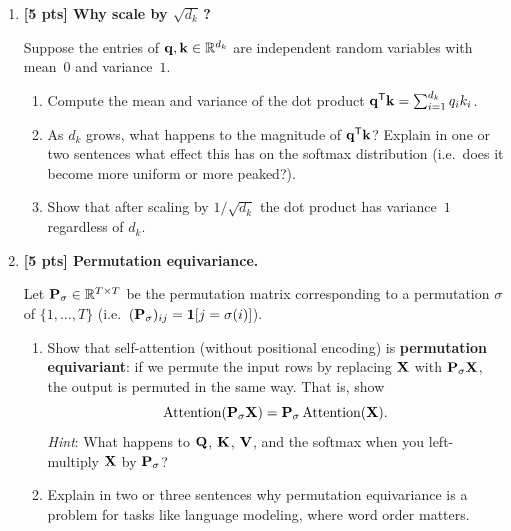 \documentclass[submit]{../harvardml}
\begin{document}
\begin{problem}
\begin{enumerate}
\begin{enumerate}
  \item Compute the scaled score matrix $\boldS / \sqrt{d_k}$.
  Then apply softmax row-wise to obtain the attention weight matrix
  $\boldA \in \reals^{2 \times 2}$.

  You may leave your answer in terms of $e^{(\cdot)}$ and sums, or compute
  decimal approximations.
\end{enumerate}
\item \textbf{[5 pts] Why scale by $\sqrt{d_k}$\,?}

Suppose the entries of $\mathbf{q}, \mathbf{k} \in \mathbb{R}^{d_k}$ are independent random
variables with mean~$0$ and variance~$1$.

\begin{enumerate}
  \item Compute the mean and variance of the dot product
  $\mathbf{q}^{\mathsf{T}} \mathbf{k} = \sum_{i=1}^{d_k} q_i k_i$.

  \item As $d_k$ grows, what happens to the magnitude of $\mathbf{q}^{\mathsf{T}} \mathbf{k}$?
  Explain in one or two sentences what effect this has on the softmax distribution
  (i.e.\ does it become more uniform or more peaked?).

  \item Show that after scaling by $1/\sqrt{d_k}$ the dot product has variance~$1$
  regardless of $d_k$.
\end{enumerate}

\item \textbf{[5 pts] Permutation equivariance.}

Let $\mathbf{P}_\sigma \in \mathbb{R}^{T \times T}$ be the permutation matrix corresponding
to a permutation $\sigma$ of $\{1, \dots, T\}$ (i.e.\ $(\mathbf{P}_\sigma)_{ij} =
\mathbf{1}[j = \sigma(i)]$).

\begin{enumerate}
  \item Show that self-attention (without positional encoding) is
  \textbf{permutation equivariant}: if we permute the input rows by replacing
  $\mathbf{X}$ with $\mathbf{P}_\sigma \mathbf{X}$, the output is permuted in the same way.
  That is, show
  \[
    \text{Attention}(\mathbf{P}_\sigma \mathbf{X}) = \mathbf{P}_\sigma \, \text{Attention}(\mathbf{X}).
  \]
  \textit{Hint}: What happens to $\mathbf{Q}$, $\mathbf{K}$, $\mathbf{V}$, and the softmax
  when you left-multiply $\mathbf{X}$ by $\mathbf{P}_\sigma$?

  \item Explain in two or three sentences why permutation equivariance is a
  problem for tasks like language modeling, where word order matters.


\end{enumerate}
\end{enumerate}
\end{problem}
\end{document}
